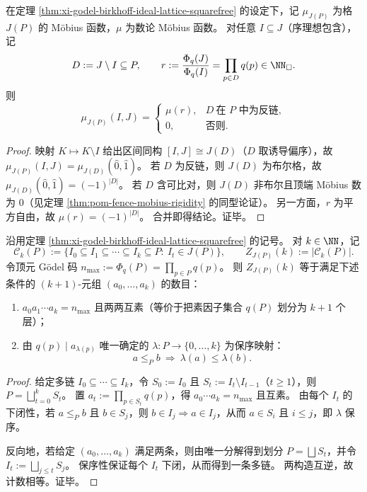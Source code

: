 \begin{corollary}\label{cor:xi-ideal-lattice-mobius-arithmeticization}
在定理 \ref{thm:xi-godel-birkhoff-ideal-lattice-squarefree} 的设定下，记 \(\mu_{J(P)}\) 为格 \(J(P)\) 的 Möbius 函数，\(\mu\) 为数论 Möbius 函数。
对任意 \(I\subseteq J\)（序理想包含），记
\[
D:=J\setminus I\subseteq P,\qquad
r:=\frac{\Phi_q(J)}{\Phi_q(I)}=\prod_{p\in D}q(p)\in\NN_{\square}.
\]
则
\[
\mu_{J(P)}(I,J)=
\begin{cases}
\mu(r),& D\ \text{在 \(P\) 中为反链},\\
0,& \text{否则}.
\end{cases}
\]
\end{corollary}
\begin{proof}
映射 \(K\mapsto K\setminus I\) 给出区间同构 \([I,J]\cong J(D)\)（\(D\) 取诱导偏序），故
\(\mu_{J(P)}(I,J)=\mu_{J(D)}(\hat 0,\hat 1)\)。
若 \(D\) 为反链，则 \(J(D)\) 为布尔格，故 \(\mu_{J(D)}(\hat 0,\hat 1)=(-1)^{|D|}\)。
若 \(D\) 含可比对，则 \(J(D)\) 非布尔且顶端 Möbius 数为 \(0\)（见定理 \ref{thm:pom-fence-mobius-rigidity} 的同型论证）。
另一方面，\(r\) 为平方自由，故 \(\mu(r)=(-1)^{|D|}\)。
合并即得结论。证毕。
\end{proof}

\begin{proposition}\label{prop:xi-ideal-lattice-multichain-prime-stratification}
沿用定理 \ref{thm:xi-godel-birkhoff-ideal-lattice-squarefree} 的记号。
对 \(k\in\NN\)，记
\[
\mathcal C_k(P):=\{I_0\subseteq I_1\subseteq\cdots\subseteq I_k\subseteq P:\ I_t\in J(P)\},
\qquad
Z_{J(P)}(k):=|\mathcal C_k(P)|.
\]
令顶元 Gödel 码
\(
n_{\max}:=\Phi_q(P)=\prod_{p\in P}q(p)
\)。
则 \(Z_{J(P)}(k)\) 等于满足下述条件的 \((k+1)\)-元组 \((a_0,\dots,a_k)\) 的数目：
\begin{enumerate}
  \item \(a_0a_1\cdots a_k=n_{\max}\) 且两两互素（等价于把素因子集合 \(q(P)\) 划分为 \(k+1\) 个层）；
  \item 由 \(q(p)\mid a_{\lambda(p)}\) 唯一确定的 \(\lambda:P\to\{0,\dots,k\}\) 为保序映射：
  \[
  a\le_P b\ \Longrightarrow\ \lambda(a)\le \lambda(b).
  \]
\end{enumerate}
\end{proposition}
\begin{proof}
给定多链 \(I_0\subseteq\cdots\subseteq I_k\)，令 \(S_0:=I_0\) 且 \(S_t:=I_t\setminus I_{t-1}\)（\(t\ge 1\)），则 \(P=\bigsqcup_{t=0}^k S_t\)。
置 \(a_t:=\prod_{p\in S_t}q(p)\)，得 \(a_0\cdots a_k=n_{\max}\) 且互素。
由每个 \(I_t\) 的下闭性，若 \(a\le_P b\) 且 \(b\in S_j\)，则 \(b\in I_j\Rightarrow a\in I_j\)，从而 \(a\in S_i\) 且 \(i\le j\)，即 \(\lambda\) 保序。

反向地，若给定 \((a_0,\dots,a_k)\) 满足两条，则由唯一分解得到划分 \(P=\bigsqcup S_t\)，并令 \(I_t:=\bigsqcup_{j\le t}S_j\)。
保序性保证每个 \(I_t\) 下闭，从而得到一条多链。
两构造互逆，故计数相等。证毕。
\end{proof}

